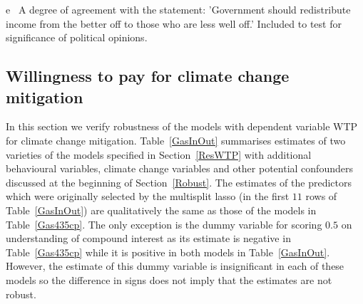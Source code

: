\documentclass[a4paper,12pt]{article}
\begin{document}
{\begin{threeparttable}
\begin{tablenotes}
\begin{footnotesize}
\begin{adjustwidth}{0.9cm}{}
\item[e]~A degree of agreement with the statement: 'Government should redistribute income from the better off to those who are less well off.' Included to test for significance of political opinions.
     \end{adjustwidth}   
\singlespacing
  \end{footnotesize}
\end{tablenotes}
  \end{threeparttable} 
\par}

\vspace{0.2cm}




















\subsection{Willingness to pay for climate change mitigation}\label{RobWTP}

In this section we verify robustness of the models with dependent variable  WTP for climate change mitigation. Table~\ref{GasInOut} summarises estimates of two varieties of the models specified in Section~\ref{ResWTP} with additional behavioural variables, climate change variables and other potential confounders discussed at the beginning of Section~\ref{Robust}. The estimates of the predictors which were originally selected by the multisplit lasso (in the first $11$ rows of Table~\ref{GasInOut}) are qualitatively the same as those of the models in Table~\ref{Gas435cp}. The only exception is the dummy variable for scoring $0.5$ on understanding of compound interest as its estimate is negative in Table~\ref{Gas435cp} while it is positive in both models in Table~\ref{GasInOut}. However, the estimate of this dummy variable is insignificant in each of these models so the difference in signs does not imply that the estimates are not robust.
\end{document}
